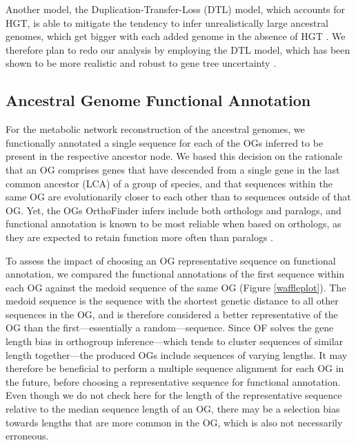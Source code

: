 Another model, the Duplication-Transfer-Loss (DTL) model, which accounts for HGT, is able to mitigate the tendency to infer unrealistically large ancestral genomes, which get bigger with each added genome in the absence of HGT \cite{doolittle2003}. We therefore plan to redo our analysis by employing the DTL model, which has been shown to be more realistic and robust to gene tree uncertainty \cite{szollosi2013, szollosi2015}.

\subsection*{Ancestral Genome Functional Annotation}

For the metabolic network reconstruction of the ancestral genomes, we functionally annotated a single sequence for each of the OGs inferred to be present in the respective ancestor node. We based this decision on the rationale that an OG comprises genes that have descended from a single gene in the last common ancestor (LCA) of a group of species, and that sequences within the same OG are evolutionarily closer to each other than to sequences outside of that OG. Yet, the OGs OrthoFinder infers include both orthologs and paralogs, and functional annotation is known to be most reliable when based on orthologs, as they are expected to retain function more often than paralogs \cite{gabaldon2013a}.

To assess the impact of choosing an OG representative sequence on functional annotation, we compared the functional annotations of the first sequence within each OG against the medoid sequence of the same OG (Figure \ref{waffleplot}). The medoid sequence is the sequence with the shortest genetic distance to all other sequences in the OG, and is therefore considered a better representative of the OG than the first---essentially a random---sequence. Since OF solves the gene length bias in orthogroup inference---which tends to cluster sequences of similar length together---the produced OGs include sequences of varying lengths. It may therefore be beneficial to perform a multiple sequence alignment for each OG in the future, before choosing a representative sequence for functional annotation. Even though we do not check here for the length of the representative sequence relative to the median sequence length of an OG, there may be a selection bias towards lengths that are more common in the OG, which is also not necessarily erroneous. 

